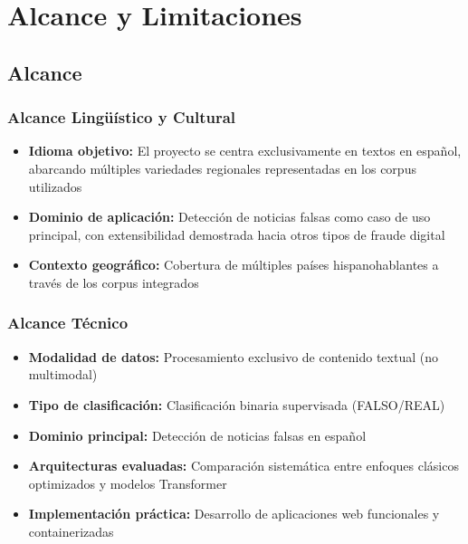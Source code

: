 \section{Alcance y Limitaciones}

\subsection{Alcance}

\subsubsection{Alcance Lingüístico y Cultural}
\begin{itemize}
    \item \textbf{Idioma objetivo:} El proyecto se centra exclusivamente en textos en español, abarcando múltiples variedades regionales representadas en los corpus utilizados
    \item \textbf{Dominio de aplicación:} Detección de noticias falsas como caso de uso principal, con extensibilidad demostrada hacia otros tipos de fraude digital
    \item \textbf{Contexto geográfico:} Cobertura de múltiples países hispanohablantes a través de los corpus integrados
\end{itemize}

\subsubsection{Alcance Técnico}
\begin{itemize}
    \item \textbf{Modalidad de datos:} Procesamiento exclusivo de contenido textual (no multimodal)
    \item \textbf{Tipo de clasificación:} Clasificación binaria supervisada (FALSO/REAL)
    \item \textbf{Dominio principal:} Detección de noticias falsas en español
    \item \textbf{Arquitecturas evaluadas:} Comparación sistemática entre enfoques clásicos optimizados y modelos Transformer
    \item \textbf{Implementación práctica:} Desarrollo de aplicaciones web funcionales y containerizadas
\end{itemize}

